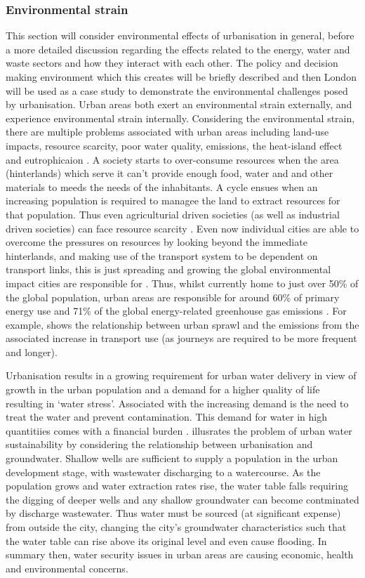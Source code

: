 \subsubsection*{Environmental strain}
This section will consider environmental effects of urbanisation in general, before a more detailed discussion regarding the effects related to the energy, water and waste sectors and how they interact with each other. The policy and decision making environment which this creates will be briefly described and then London will be used as a case study to demonstrate the environmental challenges posed by urbanisation.
Urban areas both exert an environmental strain externally, and experience environmental strain internally.
Considering the environmental strain, there are multiple problems associated with urban areas including land-use impacts, resource scarcity, poor water quality, emissions, the heat-island effect and eutrophicaion \citep{Cai2011}. A society starts to over-consume resources when the area (hinterlands) which serve it can't provide enough food, water and and other materials to meeds the needs of the inhabitants. A cycle ensues when an increasing population is required to managee the land to extract resources for that population. Thus even agriculturial driven societies (as well as industrial driven societies) can face resource scarcity \citep{Haberl2001a, Haberl2001b, Gr2003}. Even now individual cities are able to overcome the pressures on resources by looking beyond the immediate hinterlands, and making use of the transport system to be dependent on transport links, this is just spreading and growing the global environmental impact cities are responsible for \citep{Agudelo-Vera2011}. Thus, whilst currently home to just over 50\% of the global population, urban areas are responsible for around 60\% of primary energy use and 71\% of the global energy-related greenhouse gas emissions \citep{IEA2008}. For example, \citet{Grubler2009} shows the relationship between urban sprawl and the emissions from the associated increase in transport use (as journeys are required to be more frequent and longer).

Urbanisation results in a growing requirement for urban water delivery in view of growth in the urban population and a demand for a higher quality of life resulting in `water stress'. Associated with the increasing demand is the need to treat the water and prevent contamination. This demand for water in high quantitiies comes with a financial burden \citep{Diagger2009}. \citet{Kennedy} illusrates the problem of urban water sustainability by considering the relationship between urbanisation and groundwater. Shallow wells are sufficient to supply a population in the urban development stage, with wastewater discharging to a watercourse. As the population grows and water extraction rates rise, the water table falls requiring the digging of deeper wells and any shallow groundwater can become contminated by discharge wastewater. Thus water must be sourced (at significant expense) from outside the city, changing the city's groundwater characteristics such that the water table can rise above its original level and even cause flooding. In summary then, water security issues in urban areas are causing economic, health and environmental concerns.

